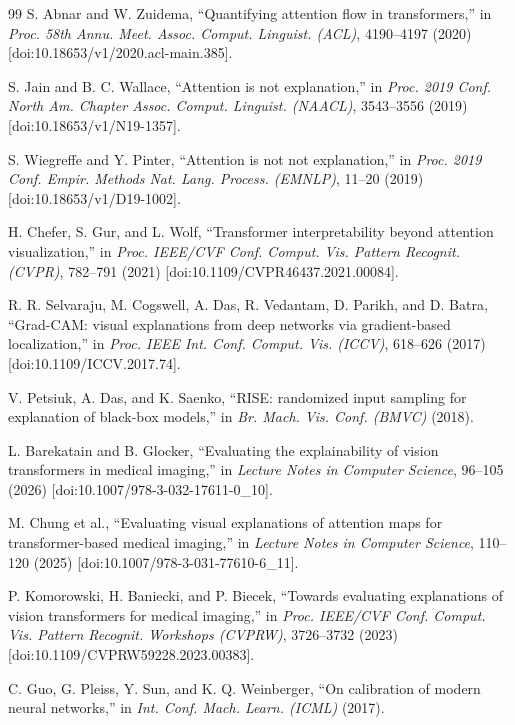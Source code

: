 \documentclass[12pt,letterpaper]{article}
\begin{document}
{\begin{thebibliography}{99}
S. Abnar and W. Zuidema, ``Quantifying attention flow in transformers,'' in \textit{Proc. 58th Annu. Meet. Assoc. Comput. Linguist. (ACL)}, 4190--4197 (2020) [doi:10.18653/v1/2020.acl-main.385].

S. Jain and B. C. Wallace, ``Attention is not explanation,'' in \textit{Proc. 2019 Conf. North Am. Chapter Assoc. Comput. Linguist. (NAACL)}, 3543--3556 (2019) [doi:10.18653/v1/N19-1357].

S. Wiegreffe and Y. Pinter, ``Attention is not not explanation,'' in \textit{Proc. 2019 Conf. Empir. Methods Nat. Lang. Process. (EMNLP)}, 11--20 (2019) [doi:10.18653/v1/D19-1002].

H. Chefer, S. Gur, and L. Wolf, ``Transformer interpretability beyond attention visualization,'' in \textit{Proc. IEEE/CVF Conf. Comput. Vis. Pattern Recognit. (CVPR)}, 782--791 (2021) [doi:10.1109/CVPR46437.2021.00084].

R. R. Selvaraju, M. Cogswell, A. Das, R. Vedantam, D. Parikh, and D. Batra, ``Grad-CAM: visual explanations from deep networks via gradient-based localization,'' in \textit{Proc. IEEE Int. Conf. Comput. Vis. (ICCV)}, 618--626 (2017) [doi:10.1109/ICCV.2017.74].

V. Petsiuk, A. Das, and K. Saenko, ``RISE: randomized input sampling for explanation of black-box models,'' in \textit{Br. Mach. Vis. Conf. (BMVC)} (2018).

L. Barekatain and B. Glocker, ``Evaluating the explainability of vision transformers in medical imaging,'' in \textit{Lecture Notes in Computer Science}, 96--105 (2026) [doi:10.1007/978-3-032-17611-0\_10].

M. Chung et al., ``Evaluating visual explanations of attention maps for transformer-based medical imaging,'' in \textit{Lecture Notes in Computer Science}, 110--120 (2025) [doi:10.1007/978-3-031-77610-6\_11].

P. Komorowski, H. Baniecki, and P. Biecek, ``Towards evaluating explanations of vision transformers for medical imaging,'' in \textit{Proc. IEEE/CVF Conf. Comput. Vis. Pattern Recognit. Workshops (CVPRW)}, 3726--3732 (2023) [doi:10.1109/CVPRW59228.2023.00383].

C. Guo, G. Pleiss, Y. Sun, and K. Q. Weinberger, ``On calibration of modern neural networks,'' in \textit{Int. Conf. Mach. Learn. (ICML)} (2017).


\end{thebibliography}}
\end{document}
